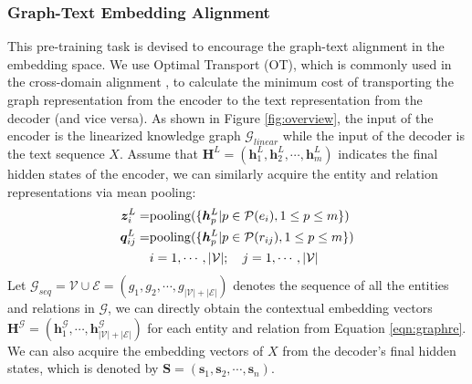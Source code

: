 \documentclass[11pt,a4paper]{article}
\begin{document}
\subsubsection{Graph-Text Embedding Alignment}



This pre-training task is devised to encourage the graph-text alignment in the embedding space. We use Optimal Transport (OT), which is commonly used in the cross-domain alignment \cite{chen2020got}, to calculate the minimum cost of transporting the graph representation from the encoder to the text representation from the decoder (and vice versa). As shown in Figure \ref{fig:overview}, the input of the encoder is the linearized knowledge graph $\mathcal{G}_{linear}$ while the input of the decoder is the text sequence $X$.
Assume that $\bm{H}^L=(\bm{h}_1^L,\bm{h}_2^L,\cdots,\bm{h}_{m}^L)$ indicates the final hidden states of the encoder, we can similarly acquire the entity and relation representations via mean pooling:
\begin{align}
\label{eqn:graphre}
    \bm{z}_{i}^{L}  = & \mathrm{pooling}(\{\bm{h}_p^L|p\in \mathcal{P}(e_i),1\leq p\leq m\}) \notag \\
    \bm{q}_{ij}^{L} = & \mathrm{pooling}(\{\bm{h}_p^L|p\in \mathcal{P}(r_{ij}),1\leq p\leq m\}) \notag \\
    & i=1,\cdots,|\mathcal{V}|;\quad j=1,\cdots,|\mathcal{V}|
\end{align}
Let $\mathcal{G}_{seq}=\mathcal{V}\cup\mathcal{E}=(g_1,g_2,\cdots,g_{|\mathcal{V}|+|\mathcal{E}|})$ denotes the sequence of all the entities and relations in $\mathcal{G}$,
we can directly obtain the contextual embedding vectors $\bm{H}^{\mathcal{G}}=(\bm{h}_1^{\mathcal{G}},\cdots,\bm{h}_{|\mathcal{V}|+|\mathcal{E}|}^{\mathcal{G}})$ for each entity and relation
from Equation \ref{eqn:graphre}.
We can also acquire the embedding vectors of $X$ from the decoder's final hidden states, which is denoted by $\bm{S}=(\bm{s}_1,\bm{s}_2,\cdots,\bm{s}_n)$.
\end{document}
